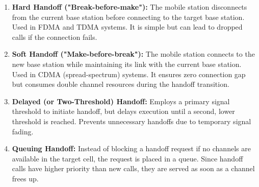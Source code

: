 \documentclass[12pt,a4paper]{article}
\begin{document}
\begin{enumerate}[label=\textbf{\arabic*.}, leftmargin=*, itemsep=4pt]
  \item \textbf{Hard Handoff ("Break-before-make"):} The mobile station disconnects from the current base station before connecting to the target base station. Used in FDMA and TDMA systems. It is simple but can lead to dropped calls if the connection fails.
  \item \textbf{Soft Handoff ("Make-before-break"):} The mobile station connects to the new base station while maintaining its link with the current base station. Used in CDMA (spread-spectrum) systems. It ensures zero connection gap but consumes double channel resources during the handoff transition.
  \item \textbf{Delayed (or Two-Threshold) Handoff:} Employs a primary signal threshold to initiate handoff, but delays execution until a second, lower threshold is reached. Prevents unnecessary handoffs due to temporary signal fading.
  \item \textbf{Queuing Handoff:} Instead of blocking a handoff request if no channels are available in the target cell, the request is placed in a queue. Since handoff calls have higher priority than new calls, they are served as soon as a channel frees up.
\end{enumerate}

\begin{tcolorbox}[tikzbox, title={Handoff Thresholds and Hysteresis}]
\centering
{}
\end{tcolorbox}
\end{document}
